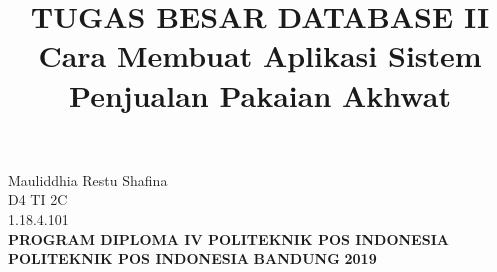\documentclass[a4paper, 12pt]{article}
\begin{document}
\title{\huge\textbf{TUGAS BESAR DATABASE II\\
Cara Membuat Aplikasi Sistem Penjualan Pakaian Akhwat}}
\date{}

\maketitle




\begin{center}
\vspace{2cm}
Mauliddhia Restu Shafina\\
D4 TI 2C\\
1.18.4.101\\
\vspace{4cm}
\textbf{PROGRAM DIPLOMA IV POLITEKNIK POS INDONESIA} \linebreak
\textbf{POLITEKNIK POS INDONESIA} \linebreak
\textbf{BANDUNG}\linebreak
\textbf{2019}\\

\end{center}
\end{document}
